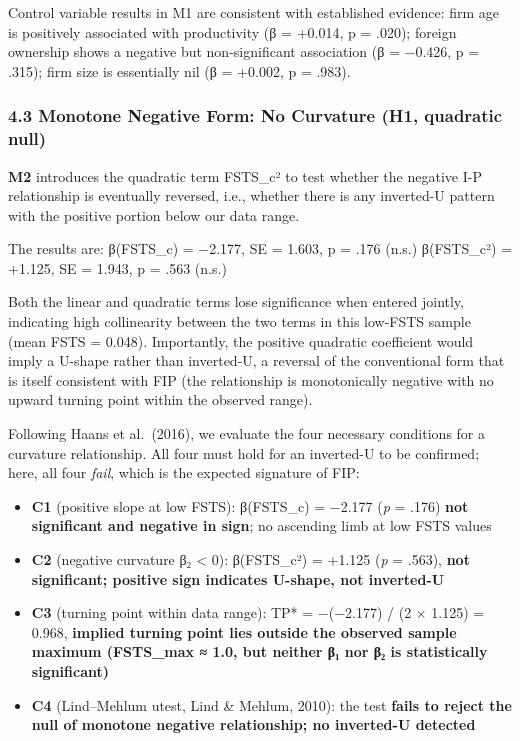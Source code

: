 \documentclass[
  12pt,a4paper]{article}
\providecommand{\tightlist}{%
  \setlength{\itemsep}{0pt}\setlength{\parskip}{0pt}}
\begin{document}
Control variable results in M1 are consistent with established evidence:
firm age is positively associated with productivity (β = +0.014, p =
.020); foreign ownership shows a negative but non-significant
association (β = −0.426, p = .315); firm size is essentially nil (β =
+0.002, p = .983).

\hypertarget{monotone-negative-form-no-curvature-h1-quadratic-null}{%
\subsubsection{4.3 Monotone Negative Form: No Curvature (H1, quadratic
null)}\label{monotone-negative-form-no-curvature-h1-quadratic-null}}

\textbf{M2} introduces the quadratic term FSTS\_c² to test whether the
negative I-P relationship is eventually reversed, i.e., whether there is
any inverted-U pattern with the positive portion below our data range.

The results are: β(FSTS\_c) = −2.177, SE = 1.603, p = .176 (n.s.)
β(FSTS\_c²) = +1.125, SE = 1.943, p = .563 (n.s.)

Both the linear and quadratic terms lose significance when entered
jointly, indicating high collinearity between the two terms in this
low-FSTS sample (mean FSTS = 0.048). Importantly, the positive quadratic
coefficient would imply a U-shape rather than inverted-U, a reversal of
the conventional form that is itself consistent with FIP (the
relationship is monotonically negative with no upward turning point
within the observed range).

Following Haans et al.~(2016), we evaluate the four necessary conditions
for a curvature relationship. All four must hold for an inverted-U to be
confirmed; here, all four \emph{fail}, which is the expected signature
of FIP:

\begin{itemize}
\tightlist
\item
  \textbf{C1} (positive slope at low FSTS): β(FSTS\_c) = −2.177
  (\emph{p} = .176) \textbf{not significant and negative in sign}; no
  ascending limb at low FSTS values
\item
  \textbf{C2} (negative curvature β₂ \textless{} 0): β(FSTS\_c²) =
  +1.125 (\emph{p} = .563), \textbf{not significant; positive sign
  indicates U-shape, not inverted-U}
\item
  \textbf{C3} (turning point within data range): TP* = −(−2.177) / (2 ×
  1.125) = 0.968, \textbf{implied turning point lies outside the
  observed sample maximum (FSTS\_max ≈ 1.0, but neither β₁ nor β₂ is
  statistically significant)}
\item
  \textbf{C4} (Lind--Mehlum utest, Lind \& Mehlum, 2010): the test
  \textbf{fails to reject the null of monotone negative relationship; no
  inverted-U detected}
\end{itemize}
\end{document}
